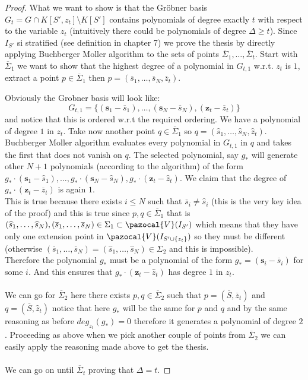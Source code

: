 \documentclass[11pt,a4paper]{report}
\theoremstyle{plain}
\theoremstyle{definition}
\newcommand{\V}{\pazocal{V}}
\begin{document}
\begin{lem-hand}[5.3]
\end{lem-hand}
\begin{proof}
	What we want to show is that the Gr\"obner basis $G_t = G \cap K[S',z_t]\setminus K[S']$	contains polynomials of degree exactly $t$ with respect to the variable $z_t$ (intuitively there could be polynomials of degree $\Delta \ge t$).
	Since $I_{S'}$ si stratified (see definition in chapter 7) we prove the thesis by directly applying Buchberger Moller algorithm to the sets of points $\overline{\Sigma}_1,\ldots,\overline{\Sigma}_t$.
	Start with $\overline{\Sigma}_1$ we want to show that the highest degree of a polynomial in $G_{t,1}$ w.r.t. $z_t$ is $1$, extract a point $p \in \overline{\Sigma}_1$ then $p = (\overline{s}_1,\ldots,\overline{s}_N,\overline{z}_t)$. 
	
	Obviously the Grobner basis will look like:
	\[
	G_{t,1} = \{(\textbf{s}_1 - \overline{s}_1),\ldots,(\textbf{s}_N - \overline{s}_N), (\textbf{z}_t - \overline{z}_t)\}
	\]
	and notice that this is ordered w.r.t the required ordering.
	We have a polynomial of degree $1$ in $z_t$. Take now another point $q \in \overline{\Sigma}_1$ so $q = (\widehat{s}_1,\ldots,\widehat{s}_N, \widehat{z}_t)$. Buchberger Moller algorithm evaluates every polynomial in $G_{t,1}$ in $q$ and takes the first that does not vanish on $q$. The selected polynomial, say $g_*$ will generate other $N+1$ polynomials (according to the algorithm) of the form $g_*\cdot(\textbf{s}_1 - \widehat{s}_1),\ldots,g_*\cdot(\textbf{s}_N - \widehat{s}_N),g_*\cdot(\textbf{z}_t - \widehat{z}_t)$. We claim that the degree of $g_*\cdot(\textbf{z}_t - \overline{z}_t)$ is again $1$.\\
	This is true because there exists $i \le N$ such that $\overline{s}_i \ne \widehat{s}_i$ (this is the very key idea of the proof) and this is true since $p,q \in \overline{\Sigma}_1$ that is \\$(\widehat{s}_1,\ldots,\widehat{s}_N), (\overline{s}_1,\ldots,\overline{s}_N) \in \Sigma_1 \subset \V(I_{S'})$ which means that they have only one extension point in $\V(I_{S' \cup \{z_t\}})$ so they must be different (otherwise $(\overline{s}_1,\ldots,\overline{s}_N) = (\widehat{s}_1,\ldots,\widehat{s}_N) \in \Sigma_2$ and this is impossible).\\
	Therefore the polynomial $g_*$ must be a polynomial of the form $g_* = (\textbf{s}_i - \overline{s}_i)$ for some $i$. And this ensures that $g_*\cdot(\textbf{z}_t - \widehat{z}_t)$ has degree $1$ in $z_t$.\\\\
	We can go for $\overline{\Sigma}_2$ here there exists $p,q \in \overline{\Sigma}_2$ such that $p = (\overline{S},\overline{z}_t)$ and $q = (\overline{S},\widehat{z}_t)$ notice that here $g_*$ will be the same for $p$ and $q$ and by the same reasoning as before $deg_{z_t}(g_*) = 0$ therefore it generates a polynomial of degree $2$. Proceeding as above when we pick another couple of points from $\overline{\Sigma}_2$ we can easily apply the reasoning made above to get the thesis.\\\\
	We can go on until $\overline{\Sigma}_t$ proving that $\Delta = t$.
\end{proof}
\end{document}
